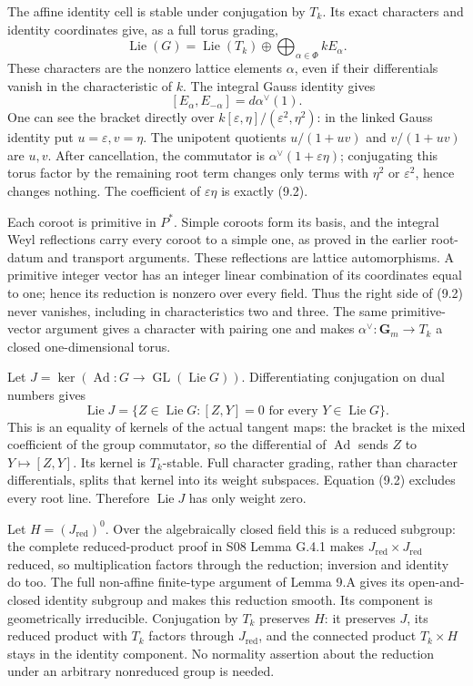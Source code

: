 \documentclass[11pt,a4paper,openany]{report}
\begin{document}
The affine identity cell is stable under conjugation by \(T_k\). Its exact characters and identity coordinates give, as a full torus grading, \[
\operatorname{Lie}(G)=\operatorname{Lie}(T_k)
 \oplus\bigoplus_{\alpha\in\Phi}kE_\alpha.
\tag{9.1}
\] These characters are the nonzero lattice elements \(\alpha\), even if their differentials vanish in the characteristic of \(k\). The integral Gauss identity gives \[
[E_\alpha,E_{-\alpha}]=d\alpha^\vee(1).
\tag{9.2}
\] One can see the bracket directly over \(k[\varepsilon,\eta]/(\varepsilon^2,\eta^2)\): in the linked Gauss identity put \(u=\varepsilon,v=\eta\). The unipotent quotients \(u/(1+uv)\) and \(v/(1+uv)\) are \(u,v\). After cancellation, the commutator is \(\alpha^\vee(1+\varepsilon\eta)\); conjugating this torus factor by the remaining root term changes only terms with \(\eta^2\) or \(\varepsilon^2\), hence changes nothing. The coefficient of \(\varepsilon\eta\) is exactly (9.2).

Each coroot is primitive in \(P^*\). Simple coroots form its basis, and the integral Weyl reflections carry every coroot to a simple one, as proved in the earlier root-datum and transport arguments. These reflections are lattice automorphisms. A primitive integer vector has an integer linear combination of its coordinates equal to one; hence its reduction is nonzero over every field. Thus the right side of (9.2) never vanishes, including in characteristics two and three. The same primitive-vector argument gives a character with pairing one and makes \(\alpha^\vee:\mathbf G_m\to T_k\) a closed one-dimensional torus.

Let \(J=\ker(\operatorname{Ad}:G\to\operatorname{GL}(\operatorname{Lie}G))\). Differentiating conjugation on dual numbers gives \[
\operatorname{Lie}J=\{Z\in\operatorname{Lie}G:[Z,Y]=0
 \text{ for every }Y\in\operatorname{Lie}G\}.
\] This is an equality of kernels of the actual tangent maps: the bracket is the mixed coefficient of the group commutator, so the differential of \(\operatorname{Ad}\) sends \(Z\) to \(Y\mapsto[Z,Y]\). Its kernel is \(T_k\)-stable. Full character grading, rather than character differentials, splits that kernel into its weight subspaces. Equation (9.2) excludes every root line. Therefore \(\operatorname{Lie}J\) has only weight zero.

Let \(H=(J_{\mathrm{red}})^0\). Over the algebraically closed field this is a reduced subgroup: the complete reduced-product proof in S08 Lemma G.4.1 makes \(J_{\mathrm{red}}\times J_{\mathrm{red}}\) reduced, so multiplication factors through the reduction; inversion and identity do too. The full non-affine finite-type argument of Lemma 9.A gives its open-and-closed identity subgroup and makes this reduction smooth. Its component is geometrically irreducible. Conjugation by \(T_k\) preserves \(H\): it preserves \(J\), its reduced product with \(T_k\) factors through \(J_{\mathrm{red}}\), and the connected product \(T_k\times H\) stays in the identity component. No normality assertion about the reduction under an arbitrary nonreduced group is needed.
\end{document}
